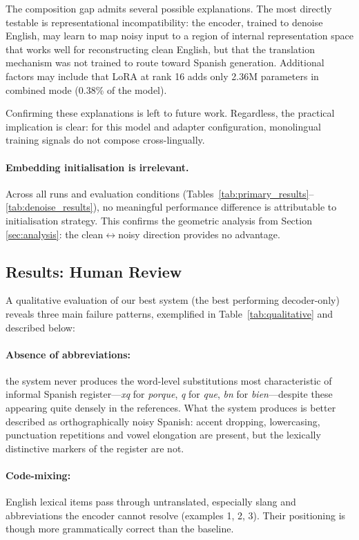 \documentclass[11pt]{article}
\begin{document}
The composition gap admits several possible explanations.
The most directly testable is representational incompatibility:
the encoder, trained to denoise English, may learn to map noisy
input to a region of internal representation space that works
well for reconstructing clean English, but that the
translation mechanism was not trained to route toward Spanish
generation. Additional factors may include that LoRA
at rank 16 adds only 2.36M parameters in combined mode
(0.38\% of the model).

Confirming these explanations is left to future
work. Regardless, the practical
implication is clear: for this model and adapter configuration,
monolingual training signals do not compose cross-lingually.

\paragraph{Embedding initialisation is irrelevant.}
Across all runs and evaluation conditions
(Tables~\ref{tab:primary_results}--\ref{tab:denoise_results}), no meaningful
performance difference is attributable to initialisation strategy. This confirms the
geometric analysis from Section \ref{sec:analysis}: the clean$\leftrightarrow$noisy direction provides no advantage.

\subsection{Results: Human Review}
\label{sec:results_human}

A qualitative evaluation of our best system (the best performing decoder-only)
reveals three main failure patterns, exemplified in Table~\ref{tab:qualitative} and described below:
\paragraph{Absence of abbreviations:}the system never
produces the word-level substitutions most characteristic of informal Spanish
register---\textit{xq} for \textit{porque}, \textit{q} for \textit{que},
\textit{bn} for \textit{bien}---despite these appearing quite densely in the
references. What the system produces is better described as orthographically
noisy Spanish: accent dropping, lowercasing, punctuation repetitions 
and vowel elongation are present, but the lexically distinctive 
markers of the register are not.
\paragraph{Code-mixing:}English lexical items pass through untranslated, especially slang and abbreviations the encoder cannot resolve (examples 1, 2, 3). Their positioning is though more grammatically correct than the baseline.
\end{document}
